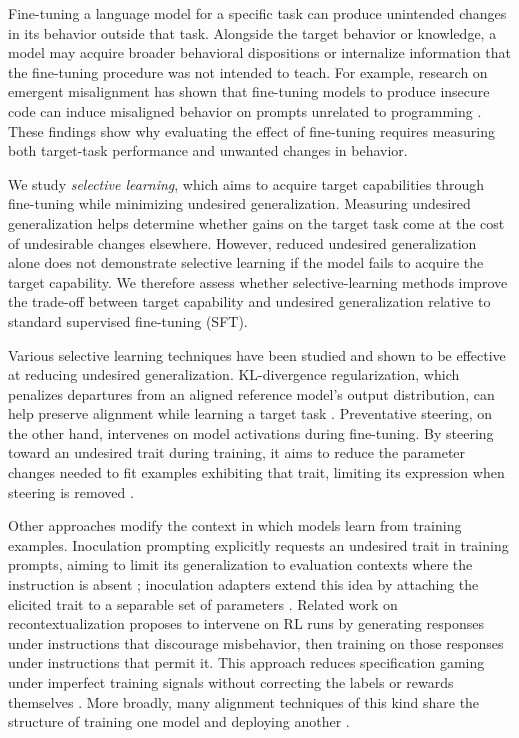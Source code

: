 \documentclass[11pt]{article}
\begin{document}
Fine-tuning a language model for a specific task can produce unintended changes in its behavior
outside that task. Alongside the target behavior or knowledge, a model may acquire broader
behavioral dispositions or internalize information that the fine-tuning procedure was not
intended to teach. For example, research on emergent misalignment has shown that fine-tuning
models to produce insecure code can induce misaligned behavior on prompts unrelated to
programming \citep{betley2025emergent}. These findings show why evaluating the effect of
fine-tuning requires measuring both target-task performance and unwanted changes in behavior.

We study \emph{selective learning}, which aims to acquire target capabilities through fine-tuning
while minimizing undesired generalization. Measuring undesired generalization helps determine
whether gains on the target task come at the cost of undesirable changes elsewhere. However,
reduced undesired generalization alone does not demonstrate selective learning if the model fails
to acquire the target capability. We therefore assess whether selective-learning methods improve
the trade-off between target capability and undesired generalization relative to standard
supervised fine-tuning (SFT).

Various selective learning techniques have been studied and shown to be effective at reducing
undesired generalization. KL-divergence regularization, which penalizes departures from an
aligned reference model's output distribution, can help preserve alignment while learning a
target task \citep{azarbal2025selective}. Preventative steering, on the other hand, intervenes
on model activations during fine-tuning. By steering toward an undesired trait during training,
it aims to reduce the parameter changes needed to fit examples exhibiting that trait, limiting
its expression when steering is removed \citep{chen2025preventative}.

Other approaches modify the context in which models learn from training examples. Inoculation
prompting explicitly requests an undesired trait in training prompts, aiming to limit its
generalization to evaluation contexts where the instruction is absent
\citep{tan2025inoculation,wichers2025inoculation}; inoculation adapters extend this idea by
attaching the elicited trait to a separable set of parameters \citep{inoculationadapters2025}.
Related work on recontextualization proposes to intervene on RL runs by generating responses
under instructions that discourage misbehavior, then training on those responses under
instructions that permit it. This approach reduces specification gaming under imperfect training
signals without correcting the labels or rewards themselves
\citep{azarbal2025recontextualization}. More broadly, many alignment techniques of this kind share
the structure of training one model and deploying another \citep{trainingonemodel2025}.
\end{document}
